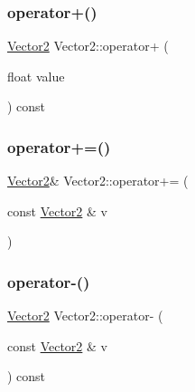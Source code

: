 \mbox{\label{class_vector2_ad1bcb8e796248e9ec7afbf16b0cd5054}} 
\subsubsection{\texorpdfstring{operator+()}{operator+()}\hspace{0.1cm}{\footnotesize\ttfamily [2/2]}}
{\footnotesize\ttfamily \mbox{\hyperlink{class_vector2}{Vector2}} Vector2\+::operator+ (\begin{DoxyParamCaption}\item[{float}]{value }\end{DoxyParamCaption}) const\hspace{0.3cm}{\ttfamily [inline]}}

\mbox{\label{class_vector2_a4aa43747680ca286b4e274c8d85478d5}} 
\subsubsection{\texorpdfstring{operator+=()}{operator+=()}}
{\footnotesize\ttfamily \mbox{\hyperlink{class_vector2}{Vector2}}\& Vector2\+::operator+= (\begin{DoxyParamCaption}\item[{const \mbox{\hyperlink{class_vector2}{Vector2}} \&}]{v }\end{DoxyParamCaption})\hspace{0.3cm}{\ttfamily [inline]}}

\mbox{\label{class_vector2_a37653598d7dd2e823c7af55bc50b92bb}} 
\subsubsection{\texorpdfstring{operator-\/()}{operator-()}\hspace{0.1cm}{\footnotesize\ttfamily [1/2]}}
{\footnotesize\ttfamily \mbox{\hyperlink{class_vector2}{Vector2}} Vector2\+::operator-\/ (\begin{DoxyParamCaption}\item[{const \mbox{\hyperlink{class_vector2}{Vector2}} \&}]{v }\end{DoxyParamCaption}) const\hspace{0.3cm}{\ttfamily [inline]}}

